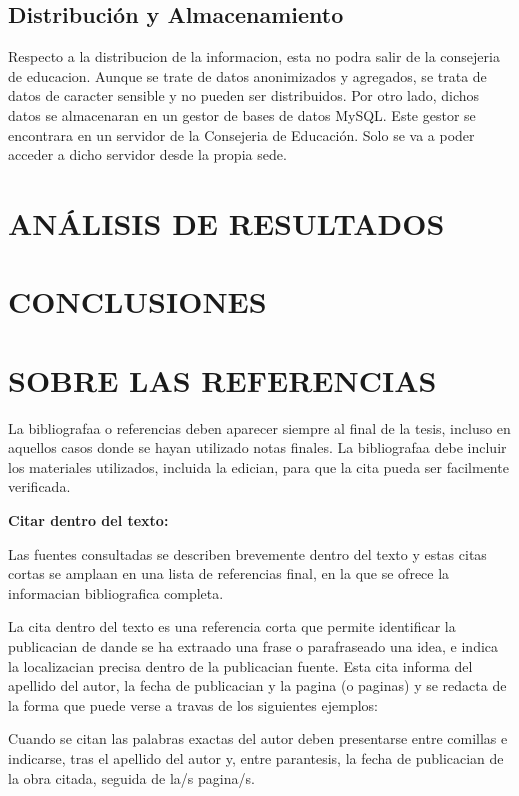 \documentclass[spanish,12pt, a4paper,twoside]{paper}
\let\oldsection\section
\def\section{\cleardoublepage\oldsection}
\begin{document}
\subsection{Distribución y Almacenamiento}
Respecto a la distribucion de la informacion, esta no podra salir de la consejeria de educacion. Aunque se trate de datos anonimizados y agregados, se trata de datos de caracter sensible y no pueden ser distribuidos. Por otro lado, dichos datos se almacenaran en un gestor de bases de datos MySQL. Este gestor se encontrara en un servidor de la Consejeria de Educación. Solo se va a poder acceder a dicho servidor desde la propia sede.


\section{ANÁLISIS DE RESULTADOS}

\section{CONCLUSIONES}

\section{SOBRE LAS REFERENCIAS}

La bibliografaa o referencias deben aparecer siempre al final de la tesis, incluso en aquellos casos donde se hayan utilizado notas finales. La bibliografaa debe incluir los materiales utilizados, incluida la edician, para que la cita pueda ser facilmente verificada. 

\bigskip
{\bf Citar dentro del texto:}

Las fuentes consultadas se describen brevemente dentro del texto y estas citas cortas se amplaan en una lista de referencias final, en la que se ofrece la informacian bibliografica completa. 

La cita dentro del texto es una referencia corta que permite identificar la publicacian de dande se ha extraado una frase o parafraseado una idea, e indica la localizacian precisa dentro de la publicacian fuente. Esta cita informa del apellido del autor, la fecha de publicacian y la pagina (o paginas) y se redacta de la forma que puede verse a travas de los siguientes ejemplos:

Cuando se citan las palabras exactas del autor deben presentarse entre comillas e indicarse, tras el apellido del autor y, entre parantesis, la fecha de publicacian de la obra citada, seguida de la/s pagina/s.
\end{document}
